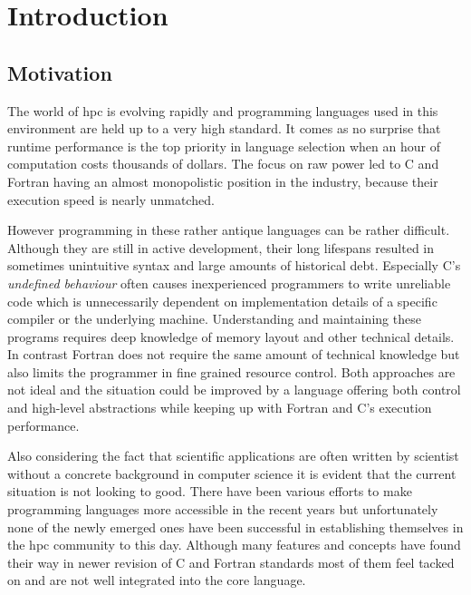 \chapter{Introduction}
\label{ch:Introduction}


\section{Motivation}
\label{sec:Introduction::Motivation}

The world of \gls{hpc} is evolving rapidly and programming languages used in this environment are held up to a very high standard. It comes as no surprise that runtime performance is the top priority in language selection when an hour of computation costs thousands of dollars.\cite{cost_of_science} The focus on raw power led to C and Fortran having an almost monopolistic position in the industry, because their execution speed is nearly unmatched.

However programming in these rather antique languages can be rather difficult. Although they are still in active development, their long lifespans resulted in sometimes unintuitive syntax and large amounts of historical debt. Especially C's \textit{undefined behaviour} often causes inexperienced programmers to write unreliable code which is unnecessarily dependent on implementation details of a specific compiler or the underlying machine. Understanding and maintaining these programs requires deep knowledge of memory layout and other technical details. In contrast Fortran does not require the same amount of technical knowledge but also limits the programmer in fine grained resource control. Both approaches are not ideal and the situation could be improved by a language offering both control and high-level abstractions while keeping up with Fortran and C's execution performance.

Also considering the fact that scientific applications are often written by scientist without a concrete background in computer science it is evident that the current situation is not looking to good. There have been various efforts to make programming languages more accessible in the recent years but unfortunately none of the newly emerged ones have been successful in establishing themselves in the \gls{hpc} community to this day. Although many features and concepts have found their way in newer revision of C and Fortran standards most of them feel tacked on and are not well integrated into the core language.

